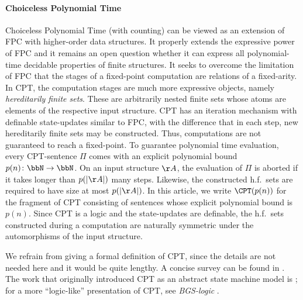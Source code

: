 \documentclass[a4paper,UKenglish,cleveref, autoref, thm-restate]{lipics-v2021}
\begin{document}
	
	\paragraph*{Choiceless Polynomial Time}
	Choiceless Polynomial Time (with counting) can be viewed as an extension of FPC with higher-order data structures.  It properly extends the expressive power of FPC and it remains an open question whether it can express all polynomial-time decidable properties of finite structures.  It seeks to overcome the limitation of FPC that the stages of a fixed-point computation are relations of a fixed-arity. In CPT, the computation stages are much more expressive objects, namely \emph{hereditarily finite sets}. These are arbitrarily nested finite sets whose atoms are elements of the respective input structure.   CPT has an iteration mechanism with definable state-updates similar to FPC, with the difference that in each step, new hereditarily finite sets may be constructed. Thus, computations are not guaranteed to reach a fixed-point. To guarantee polynomial time evaluation, every CPT-sentence $\Pi$ comes with an explicit polynomial bound $p(n) \colon \bbN \to \bbN$. On an input structure $\AA$, the evaluation of $\Pi$ is aborted if it takes longer than $p(|\AA|)$ many steps. Likewise, the constructed h.f.\ sets are required to have size at most $p(|\AA|)$. 
	In this article, we write $\CPT(p(n))$ for the fragment of CPT consisting of sentences whose explicit polynomial bound is $p(n)$.
	Since CPT is a logic and the state-updates are definable, the h.f.\ sets constructed during a computation are naturally symmetric under the automorphisms of the input structure.
	
	
	We refrain from giving a formal definition of CPT, since the details are not needed here and it would be quite lengthy. 
	A concise survey can be found in \cite{gradel2015polynomial}. The work that originally introduced CPT as an abstract state machine model is \cite{CPT}; for a more ``logic-like'' presentation of CPT, see \emph{BGS-logic} \cite{rossman2010choiceless}.
	
	
\end{document}
